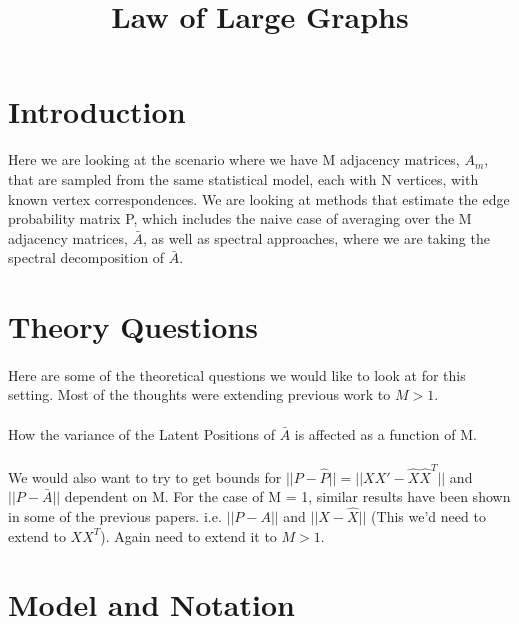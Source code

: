 \documentclass[10pt]{article}
\title{Law of Large Graphs}
\author{}
\date{}
\begin{document}
\large
\maketitle
\thispagestyle{headings}

\vspace{-.5in}

\section{Introduction}
Here we are looking at the scenario where we have M adjacency matrices, $A_m$, that are sampled from the same statistical model, each with N vertices, with known vertex correspondences.  We are looking at methods that estimate the edge probability matrix P, which includes the naive case of averaging over the M adjacency matrices, $\bar{A}$, as well as spectral approaches, where we are taking the spectral decomposition of $\bar{A}$.

\section{Theory Questions}
\paragraph{} Here are some of the theoretical questions we would like to look at for this setting. Most of the thoughts were extending previous work to $M > 1$. 
\\\\
How the variance of the Latent Positions  of $\bar{A}$ is affected as a function of M.
\\\\
We would also want to try to get bounds for $|| P - \hat{P}|| = || XX' - \hat{X}\hat{X}^T||$  and $|| P - \bar{A} ||$ dependent on M.  For the case of M = 1,  similar results have been shown in some of the previous papers.  i.e. $|| P - A ||$ and $|| X - \hat{X}||$ (This we'd need to extend to $XX^T$).  Again need to extend it to $M>1$.
\section{Model and Notation}
\end{document}
